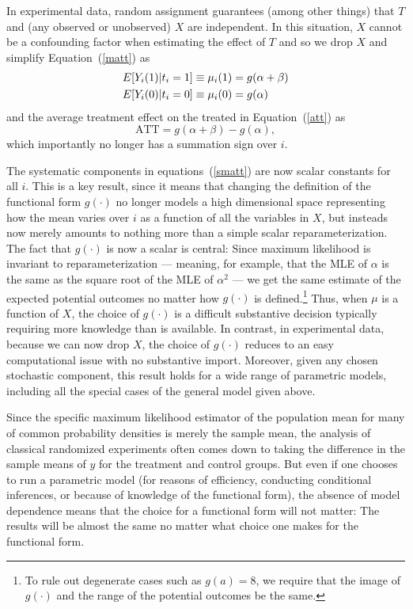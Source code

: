 \documentclass[11pt,titlepage]{article}
\begin{document}
In experimental data, random assignment guarantees (among other
things) that $T$ and (any observed or unobserved) $X$ are independent.
In this situation, $X$ cannot be a confounding factor when estimating
the effect of $T$ and so we drop $X$ and simplify
Equation~(\ref{matt}) as
\begin{align}
  \label{smatt}
  E[Y_i(1)|t_i=1] &\equiv \mu_i(1) = g(\alpha + \beta)\notag \\
  E[Y_i(0)|t_i=0] &\equiv \mu_i(0) = g(\alpha)
\end{align}
and the average treatment effect on the treated in
Equation~(\ref{att}) as
\begin{equation}
  \label{satt}
  \text{ATT} = g(\alpha+\beta) - g(\alpha),
\end{equation}
which importantly no longer has a summation sign over $i$.

The systematic components in equations~(\ref{smatt}) are now scalar
constants for all $i$.  This is a key result, since it means that
changing the definition of the functional form $g(\cdot)$ no longer
models a high dimensional space representing how the mean varies over
$i$ as a function of all the variables in $X$, but insteads now merely
amounts to nothing more than a simple scalar reparameterization.  The
fact that $g(\cdot)$ is now a scalar is central: Since maximum
likelihood is invariant to reparameterization --- meaning, for
example, that the MLE of $\alpha$ is the same as the square root of
the MLE of $\alpha^2$ \citep[][p.75--76]{King89} --- we get the same
estimate of the expected potential outcomes no matter how $g(\cdot)$
is defined.\footnote{To rule out degenerate cases such as $g(a)=8$, we
  require that the image of $g(\cdot)$ and the range of the potential
  outcomes be the same.}  Thus, when $\mu$ is a function of $X$, the
choice of $g(\cdot)$ is a difficult substantive decision typically
requiring more knowledge than is available.  In contrast, in
experimental data, because we can now drop $X$, the choice of
$g(\cdot)$ reduces to an easy computational issue with no substantive
import.  Moreover, given any chosen stochastic component, this result
holds for a wide range of parametric models, including all the special
cases of the general model given above.

Since the specific maximum likelihood estimator of the population mean
for many of common probability densities is merely the sample mean,
the analysis of classical randomized experiments often comes down to
taking the difference in the sample means of $y$ for the treatment and
control groups.  But even if one chooses to run a parametric model
(for reasons of efficiency, conducting conditional inferences, or
because of knowledge of the functional form), the absence of model
dependence means that the choice for a functional form will not
matter: The results will be almost the same no matter what choice one
makes for the functional form.
\end{document}
